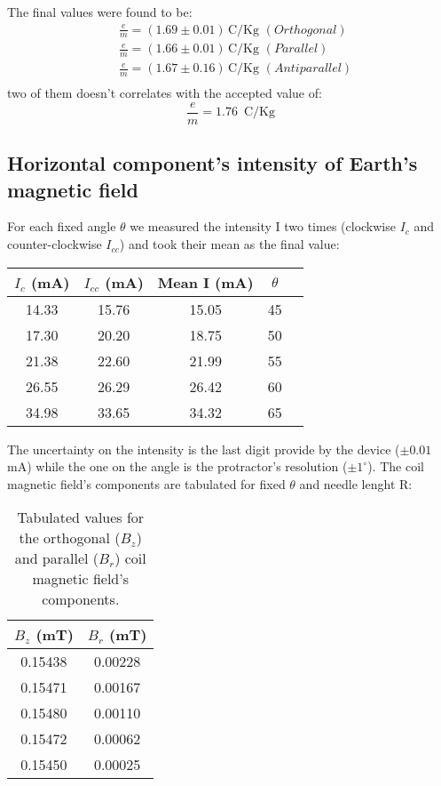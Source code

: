 The final values were found to be:
\begin{align*}
    &\frac{e}{m}=(1.69\pm0.01)\, \mathrm{C/Kg}\,\, (Orthogonal)\\
    &\frac{e}{m}=(1.66\pm0.01)\, \mathrm{C/Kg}\,\, (Parallel)\\
    &\frac{e}{m}=(1.67\pm0.16)\, \mathrm{C/Kg}\,\, (Antiparallel)\\
\end{align*}
two of them doesn't correlates with the accepted value of:
\begin{equation*}
    \frac{e}{m}=1.76\,\,\, \mathrm{C/Kg}
\end{equation*}



\subsection{Horizontal component's intensity of Earth's magnetic field}
For each fixed angle $\theta$ we measured the intensity I two times (clockwise $I_c$ and counter-clockwise $I_{cc}$) and took their mean as the final value:
\begin{table}[H]
\centering
\begin{tabular}{|c|c|c|c|c|}
\hline
$I_c$ (mA) & $I_{cc}$ (mA) & Mean I (mA) & $\theta$ \\ \hline
14.33 & 15.76 & 15.05 & 45  \\ \hline
17.30 & 20.20 & 18.75 & 50  \\ \hline
21.38 & 22.60 & 21.99 & 55  \\ \hline
26.55 & 26.29 & 26.42 & 60  \\ \hline
34.98 & 33.65 & 34.32 & 65  \\ \hline
\end{tabular}
\end{table}
The uncertainty on the intensity is the last digit provide by the device ($\pm 0.01$ mA) while the one on the angle is the protractor's resolution ($\pm 1^{\circ}$).
The coil magnetic field's components are tabulated for fixed $\theta$ and needle lenght R:
\begin{table}[H]
\centering
\begin{tabular}{|c|c|}
\hline
$B_z$ (mT) & $B_r$ (mT)\\ \hline
0.15438 & 0.00228 \\ \hline
0.15471 & 0.00167 \\ \hline
0.15480 & 0.00110 \\ \hline
0.15472 & 0.00062 \\ \hline
0.15450 & 0.00025 \\ \hline
\end{tabular}
\caption{Tabulated values for the orthogonal ($B_z$) and parallel ($B_r$) coil magnetic field's components.}
\end{table}

